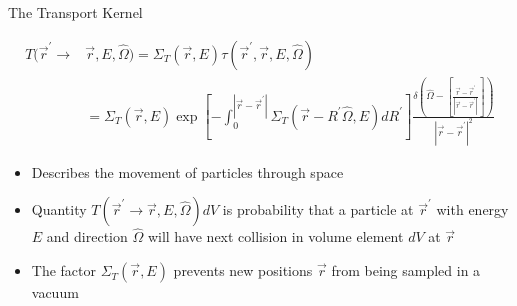 \documentclass{beamer}
\begin{document}
\begin{frame}{The Transport Kernel}

  \begin{align}
    T(\vec{r}^{'} \to &\vec{r},E,\hat{\Omega}) = \Sigma_T(\vec{r},E)
    \tau(\vec{r}^{'},\vec{r},E,\hat{\Omega}) \nonumber \\
    & = \Sigma_T(\vec{r},E)
    \exp{\left[-\int_0^{|\vec{r} - \vec{r}^{'}|} 
        \Sigma_T(\vec{r}-R^{'}\hat{\Omega},E)dR^{'} \right]} %
    \frac{\delta \left(\hat{\Omega} - \left[\frac{\vec{r} - \vec{r}^{'}}
        {|\vec{r} - \vec{r}^{'}|}\right]\right)}
         {|\vec{r} - \vec{r}^{'}|^2} \nonumber
  \end{align}

  \begin{itemize}
    \item Describes the movement of particles through space
      \medskip
    \item Quantity $T(\vec{r}^{'} \to \vec{r},E,\hat{\Omega})dV$ is  
      probability that a particle at $\vec{r}^{'}$ with energy $E$ and 
      direction $\hat{\Omega}$ will have next collision in volume element 
      $dV$ at $\vec{r}$
      \medskip
    \item The factor $\Sigma_T(\vec{r},E)$ prevents new positions $\vec{r}$ from
      being sampled in a vacuum
  \end{itemize}

\end{frame}
\end{document}
